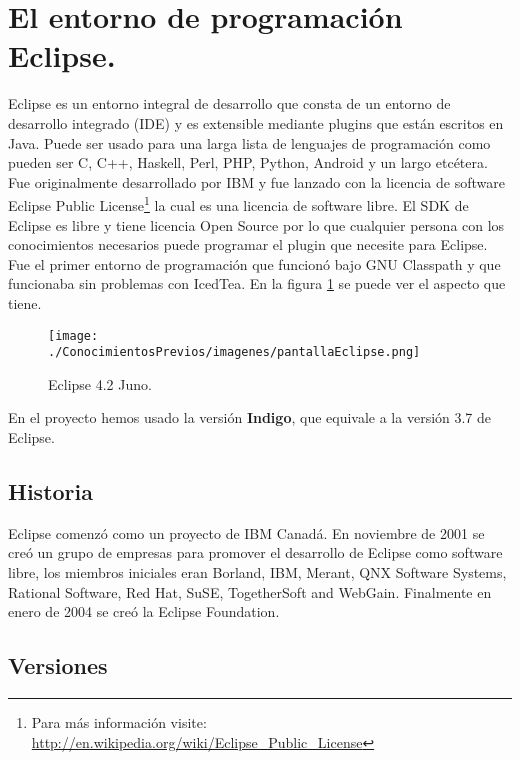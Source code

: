 \section{El entorno de programación Eclipse.}

Eclipse es un entorno integral de desarrollo que consta de un entorno de desarrollo integrado (IDE) y es extensible mediante plugins que están escritos en Java. Puede ser usado para una larga lista de lenguajes de programación como pueden ser C, C++, Haskell, Perl, PHP, Python, Android y un largo etcétera. Fue originalmente desarrollado por IBM y fue lanzado con la licencia de software Eclipse Public License\footnote{ Para más información visite: \url{http://en.wikipedia.org/wiki/Eclipse\_Public\_License}} la cual es una licencia de software libre. El SDK de Eclipse es libre y tiene licencia Open Source por lo que cualquier persona con los conocimientos necesarios puede programar el plugin que necesite para Eclipse. Fue el primer entorno de programación que funcionó bajo GNU Classpath y que funcionaba sin problemas con IcedTea. En la figura \ref{fig:pantallaEclipse} se puede ver el aspecto que tiene.

\begin{figure}
  \centering
    \texttt{[image: ./ConocimientosPrevios/imagenes/pantallaEclipse.png]}
  \caption{Eclipse 4.2 Juno.}
  \label{fig:pantallaEclipse}
\end{figure} 

En el proyecto hemos usado la versión \textbf{Indigo}, que equivale a la versión 3.7 de Eclipse.

\subsection{Historia}

Eclipse comenzó como un proyecto de IBM Canadá. En noviembre de 2001 se creó un grupo de empresas para promover el desarrollo de Eclipse como software libre, los miembros iniciales eran Borland, IBM, Merant, QNX Software Systems, Rational Software, Red Hat, SuSE, TogetherSoft and WebGain. Finalmente en enero de 2004 se creó la Eclipse Foundation. 

\subsection{Versiones}

